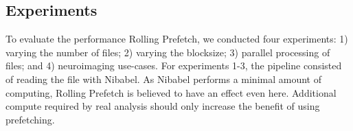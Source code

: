 


\subsection{Experiments}
To evaluate the performance Rolling Prefetch, we conducted four experiments: 1)
varying the number of files; 2) varying the blocksize; 3) parallel processing of
files;  and 4) neuroimaging use-cases. For experiments 1-3, the pipeline
consisted of reading the file with Nibabel. As Nibabel performs a minimal amount
of computing, Rolling Prefetch is believed to have an effect even here.
Additional compute required by real analysis should only increase the benefit of
using prefetching.

